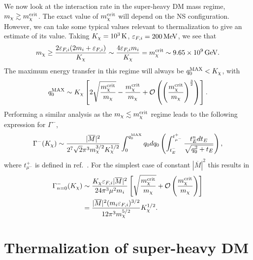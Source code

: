 We now look at the interaction rate in the super-heavy DM mass regime, $m_\chi \gtrsim m_\chi^{\rm crit}$.
The exact value of $m_\chi^{\rm crit}$ will depend on the NS configuration. However, we can take some typical values relevant to thermalization to give an estimate of its value. Taking $K_\chi=10^3{\rm \,K}$, $\varepsilon_{F,i}=200{\rm \,MeV}$, we see that
\begin{equation}
    m_\chi \ge \frac{2\varepsilon_{F,i}(2m_i+\varepsilon_{F,i})}{ K_\chi} \sim \frac{4\varepsilon_{F,i} m_i}{K_\chi} = m_\chi^{\rm crit}\sim 9.65\times10^9{\rm \,GeV}. 
\end{equation}
The maximum energy transfer in this regime will always be $q_0^{\rm MAX}<K_\chi$, with
\begin{equation}
    q_0^{\rm MAX}\sim K_\chi\left[2\sqrt{\frac{m_\chi^{\rm crit}}{m_\chi }} - \frac{m_\chi^{\rm crit}}{m_\chi } +\mathcal{O}\left(\left(\frac{m_\chi^{\rm crit}}{m_\chi}\right)^{\frac{3}{2}}\right)\right].
 \end{equation}
Performing a similar analysis as the $m_\chi \lesssim m_\chi^{\rm crit}$ regime leads to the following expression for $\Gamma^-$,
\begin{equation}
\Gamma^{-}(K_\chi) \sim \frac{|\overline{M}|^2}{2^7\sqrt{2}\pi^3m_\chi^{3/2}K_\chi^{1/2}}\int_0^{	q_0^{\rm MAX}}q_0 dq_0 \left(\int_{t_{E}^{-}}^{t_{\mu^-}^{+}} \frac{t_E^n dt_E }{\sqrt{q_0^2+t_E}} \right),  
\end{equation} 
where $t_{\mu^-}^+$ is defined in ref.~\cite{Bell:2020jou_sep_ImprovedTreatmentDark}. 
For the simplest case of constant $|\overline{M}|^2$ this results in 
\begin{align}
\Gamma^{-}_{n=0}(K_\chi) & \sim  
\frac{K_\chi \varepsilon_{F,i} |\overline{M}|^2}{24\pi^3\mu^2m_i}\left[\sqrt{\frac{m_\chi^{\rm crit}}{m_\chi}}+\mathcal{O}\left(\frac{m_\chi^{\rm crit}}{m_\chi}\right)\right] \nonumber\\
& = \frac{|\overline{M}|^2(m_i\varepsilon_{F,i})^{3/2}}{12 \pi^3m_\chi^{5/2}}K_\chi^{1/2}.\label{eq:intraten0largem}
\end{align}



\section{Thermalization of super-heavy DM}
\label{sec:thermsuperheavy}



